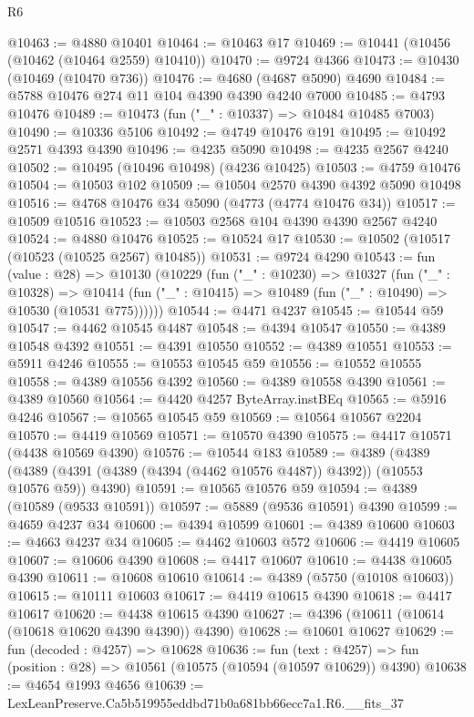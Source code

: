 \begin{lexlean}{R6}
\begin{coremodule}
@10463 := @4880 @10401
@10464 := @10463 @17
@10469 := @10441 (@10456 (@10462 (@10464 @2559) @10410))
@10470 := @9724 @4366
@10473 := @10430 (@10469 (@10470 @736))
@10476 := @4680 (@4687 @5090) @4690
@10484 := @5788 @10476 @274 @11 @104 @4390 @4390 @4240 @7000
@10485 := @4793 @10476
@10489 := @10473 (fun ("_" : @10337) => @10484 @10485 @7003)
@10490 := @10336 @5106
@10492 := @4749 @10476 @191
@10495 := @10492 @2571 @4393 @4390
@10496 := @4235 @5090
@10498 := @4235 @2567 @4240
@10502 := @10495 (@10496 @10498) (@4236 @10425)
@10503 := @4759 @10476
@10504 := @10503 @102
@10509 := @10504 @2570 @4390 @4392 @5090 @10498
@10516 := @4768 @10476 @34 @5090 (@4773 (@4774 @10476 @34))
@10517 := @10509 @10516
@10523 := @10503 @2568 @104 @4390 @4390 @2567 @4240
@10524 := @4880 @10476
@10525 := @10524 @17
@10530 := @10502 (@10517 (@10523 (@10525 @2567) @10485))
@10531 := @9724 @4290
@10543 := fun (value : @28) =>
  @10130
    (@10229
      (fun ("_" : @10230) =>
      @10327
        (fun ("_" : @10328) =>
        @10414 (fun ("_" : @10415) => @10489 (fun ("_" : @10490) => @10530 (@10531 @775))))))
@10544 := @4471 @4237
@10545 := @10544 @59
@10547 := @4462 @10545 @4487
@10548 := @4394 @10547
@10550 := @4389 @10548 @4392
@10551 := @4391 @10550
@10552 := @4389 @10551
@10553 := @5911 @4246
@10555 := @10553 @10545 @59
@10556 := @10552 @10555
@10558 := @4389 @10556 @4392
@10560 := @4389 @10558 @4390
@10561 := @4389 @10560
@10564 := @4420 @4257 ByteArray.instBEq
@10565 := @5916 @4246
@10567 := @10565 @10545 @59
@10569 := @10564 @10567 @2204
@10570 := @4419 @10569
@10571 := @10570 @4390
@10575 := @4417 @10571 (@4438 @10569 @4390)
@10576 := @10544 @183
@10589 := @4389
    (@4389 (@4389 (@4391 (@4389 (@4394 (@4462 @10576 @4487)) @4392)) (@10553 @10576 @59)) @4390)
@10591 := @10565 @10576 @59
@10594 := @4389 (@10589 (@9533 @10591))
@10597 := @5889 (@9536 @10591) @4390
@10599 := @4659 @4237 @34
@10600 := @4394 @10599
@10601 := @4389 @10600
@10603 := @4663 @4237 @34
@10605 := @4462 @10603 @572
@10606 := @4419 @10605
@10607 := @10606 @4390
@10608 := @4417 @10607
@10610 := @4438 @10605 @4390
@10611 := @10608 @10610
@10614 := @4389 (@5750 (@10108 @10603))
@10615 := @10111 @10603
@10617 := @4419 @10615 @4390
@10618 := @4417 @10617
@10620 := @4438 @10615 @4390
@10627 := @4396 (@10611 (@10614 (@10618 @10620 @4390 @4390)) @4390)
@10628 := @10601 @10627
@10629 := fun (decoded : @4257) => @10628
@10636 := fun (text : @4257) =>
  fun (position : @28) => @10561 (@10575 (@10594 (@10597 @10629)) @4390)
@10638 := @4654 @1993 @4656
@10639 := LexLeanPreserve.Ca5b519955eddbd71b0a681bb66ecc7a1.R6.__fits_37

\end{coremodule}
\end{lexlean}
